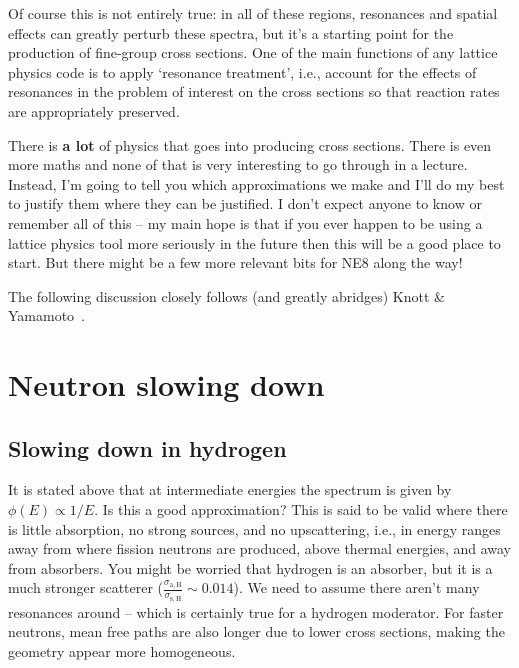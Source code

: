 \documentclass{article}
\begin{document}
Of course this is not entirely true: in all of these regions, resonances and spatial effects can greatly perturb these spectra, but it's a starting point for the production of fine-group cross sections. One of the main functions of any lattice physics code is to apply `resonance treatment', i.e., account for the effects of resonances in the problem of interest on the cross sections so that reaction rates are appropriately preserved.

There is \textbf{a lot} of physics that goes into producing cross sections. There is even more maths and none of that is very interesting to go through in a lecture. Instead, I'm going to tell you which approximations we make and I'll do my best to justify them where they can be justified. I don't expect anyone to know or remember all of this -- my main hope is that if you ever happen to be using a lattice physics tool more seriously in the future then this will be a good place to start. But there might be a few more relevant bits for NE8 along the way!

The following discussion closely follows (and greatly abridges) Knott \& Yamamoto~\cite{Knott}.

\section{Neutron slowing down}

\subsection{Slowing down in hydrogen}
It is stated above that at intermediate energies the spectrum is given by $\phi(E) \propto 1/E$. Is this a good approximation? This is said to be valid where there is little absorption, no strong sources, and no upscattering, i.e., in energy ranges away from where fission neutrons are produced, above thermal energies, and away from absorbers. You might be worried that hydrogen is an absorber, but it is a much stronger scatterer ($\frac{\sigma_\mathrm{a,H}}{\sigma_\mathrm{s,H}}\sim 0.014$). We need to assume there aren't many resonances around -- which is certainly true for a hydrogen moderator. For faster neutrons, mean free paths are also longer due to lower cross sections, making the geometry appear more homogeneous.
\end{document}
